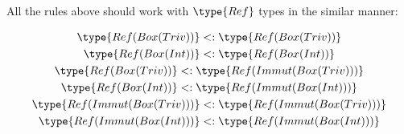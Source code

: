\documentclass{article}
\newcommand\subtype{\mathrel{<:}}
\begin{document}
\medskip

All the rules above should work with $\type{Ref}$ types in the similar manner:

\begin{gather*}
  \type{Ref(Box(Triv))}        \subtype \type{Ref(Box(Triv))}\\
  \type{Ref(Box(Int))}         \subtype \type{Ref(Box(Int))}\\
  \type{Ref(Box(Triv))}        \subtype \type{Ref(Immut(Box(Triv)))}\\
  \type{Ref(Box(Int))}         \subtype \type{Ref(Immut(Box(Int)))}\\
  \type{Ref(Immut(Box(Triv)))} \subtype \type{Ref(Immut(Box(Triv)))}\\
  \type{Ref(Immut(Box(Int)))}  \subtype \type{Ref(Immut(Box(Int)))}
\end{gather*}

\end{document}
